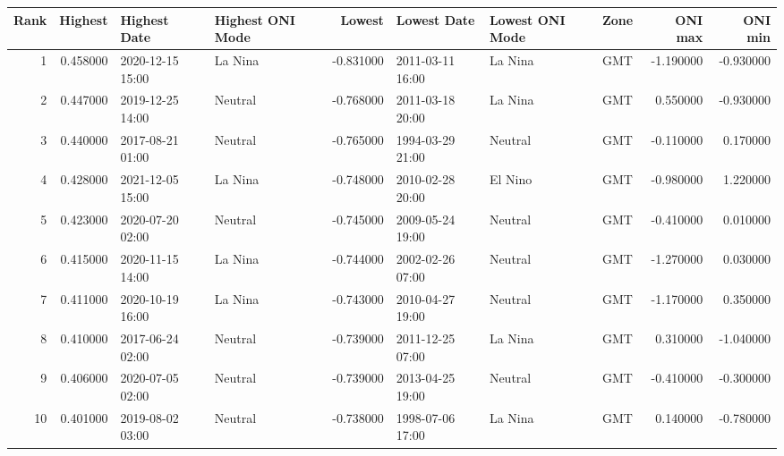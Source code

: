 \begin{tabular}{rrllrlllrr}
\toprule
Rank & Highest & Highest Date & Highest ONI Mode & Lowest & Lowest Date & Lowest ONI Mode & Zone & ONI max & ONI min \\
\midrule
1 & 0.458000 & 2020-12-15 15:00 & La Nina & -0.831000 & 2011-03-11 16:00 & La Nina & GMT & -1.190000 & -0.930000 \\
2 & 0.447000 & 2019-12-25 14:00 & Neutral & -0.768000 & 2011-03-18 20:00 & La Nina & GMT & 0.550000 & -0.930000 \\
3 & 0.440000 & 2017-08-21 01:00 & Neutral & -0.765000 & 1994-03-29 21:00 & Neutral & GMT & -0.110000 & 0.170000 \\
4 & 0.428000 & 2021-12-05 15:00 & La Nina & -0.748000 & 2010-02-28 20:00 & El Nino & GMT & -0.980000 & 1.220000 \\
5 & 0.423000 & 2020-07-20 02:00 & Neutral & -0.745000 & 2009-05-24 19:00 & Neutral & GMT & -0.410000 & 0.010000 \\
6 & 0.415000 & 2020-11-15 14:00 & La Nina & -0.744000 & 2002-02-26 07:00 & Neutral & GMT & -1.270000 & 0.030000 \\
7 & 0.411000 & 2020-10-19 16:00 & La Nina & -0.743000 & 2010-04-27 19:00 & Neutral & GMT & -1.170000 & 0.350000 \\
8 & 0.410000 & 2017-06-24 02:00 & Neutral & -0.739000 & 2011-12-25 07:00 & La Nina & GMT & 0.310000 & -1.040000 \\
9 & 0.406000 & 2020-07-05 02:00 & Neutral & -0.739000 & 2013-04-25 19:00 & Neutral & GMT & -0.410000 & -0.300000 \\
10 & 0.401000 & 2019-08-02 03:00 & Neutral & -0.738000 & 1998-07-06 17:00 & La Nina & GMT & 0.140000 & -0.780000 \\
\bottomrule
\end{tabular}
